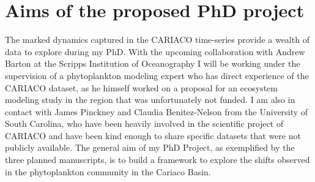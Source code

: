 \newpage
\section{Aims of the proposed PhD project}

The marked dynamics captured in the CARIACO time-series provide a wealth of data to explore during my PhD. With the upcoming collaboration with Andrew Barton at the Scripps Institution of Oceanography I will be working under the supervision of a phytoplankton modeling expert who has direct experience of the CARIACO dataset, as he himself worked on a proposal for an ecosystem modeling study in the region that was unfortunately not funded. I am also in contact with James Pinckney and Claudia Benitez-Nelson from the University of South Carolina, who have been heavily involved in the scientific project of CARIACO and have been kind enough to share specific datasets that were not publicly available. The general aim of my PhD Project, as exemplified by the three planned manuscripts, is to build a framework to explore the shifts observed in the phytoplankton community in the Cariaco Basin.

